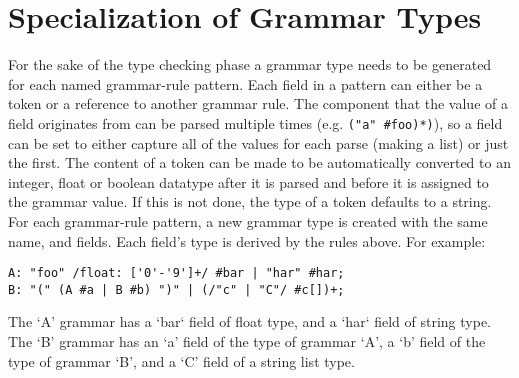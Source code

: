 
\section{Specialization of Grammar Types}
{
	For the sake of the type checking phase
	a grammar type needs to be generated for each named grammar-rule pattern.
	Each field in a pattern can either be a token or a reference to
	another grammar rule. The component that the value of a field
	originates from can be parsed multiple times (e.g. \texttt{("a" \#foo)*)}),
	so a field can be set to either capture all of the values for each
	parse (making a list) or just the first.
	The content of a token can be made to be
	automatically converted to an integer, float or
	boolean datatype after it is parsed and before it is assigned to the
	grammar value. If this is not done, the type of a token defaults to a string.
	For each grammar-rule pattern, a new grammar type is created with the
	same name, and fields. Each field's type is derived by the rules above.
	For example:
	
	\begin{lstlisting}[numbers=none, numbers = none, texcl = true, language = MAIA]
A: "foo" /float: ['0'-'9']+/ #bar | "har" #har;
B: "(" (A #a | B #b) ")" | (/"c" | "C"/ #c[])+;
	\end{lstlisting}
	
	The `A' grammar has a `bar` field of float type, and a `har` field of
	string type. The `B' grammar has an `a' field of the type of grammar `A',
	a `b' field of the type of grammar `B', and a `C' field of a
	string list type.
}
